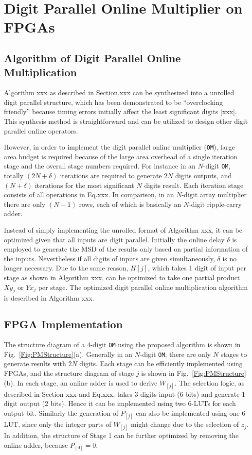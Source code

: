 \documentclass[conference]{IEEEtran}
\begin{document}
\section{Digit Parallel Online Multiplier on FPGAs}\label{Sec:OM_FPGA}
\subsection{Algorithm of Digit Parallel Online Multiplication}
Algorithm xxx as described in Section.xxx can be synthesized into a unrolled digit parallel structure, which has been demonstrated to be ``overclocking friendly'' because timing errors initially affect the least significant digits [xxx]. This synthesis method is straightforward and can be utilized to design other digit parallel online operators.

However, in order to implement the digit parallel online multiplier (\texttt{OM}), large area budget is required because of the large area overhead of a single iteration stage and the overall stage numbers required. For instance in an $N$-digit \texttt{OM}, totally $(2N+\delta)$ iterations are required to generate $2N$ digits outputs, and $(N+\delta)$ iterations for the most significant $N$ digits result. Each iteration stage consists of all operations in Eq.xxx. In comparison, in an $N$-digit array multiplier there are only $(N-1)$ rows, each of which is basically an $N$-digit ripple-carry adder.

Instead of simply implementing the unrolled format of Algorithm xxx, it can be optimized given that all inputs are digit parallel. Initially the online delay $\delta$ is employed to generate the MSD of the results only based on partial information of the inputs. Nevertheless if all digits of inputs are given simultaneously, $\delta$ is no longer necessary. Due to the same reason, $H[j]$, which takes 1 digit of input per stage as shown in Algorithm xxx, can be optimized to take one partial product $Xy_j$ or $Yx_j$ per stage. The optimized digit parallel online multiplication algorithm is described in Algorithm xxx.


\subsection{FPGA Implementation}
The structure diagram of a 4-digit \texttt{OM} using the proposed algorithm is shown in Fig.~\ref{Fig:PMStructure}(a). Generally in an $N$-digit \texttt{OM}, there are only $N$ stages to generate results with $2N$ digits. Each stage can be efficiently implemented using FPGAs, and the structure diagram of stage $j$ is shown in Fig.~\ref{Fig:PMStructure}(b). In each stage, an online adder is used to derive $W_{[j]}$. The selection logic, as described in Section xxx and Eq.xxx, takes 3 digits input (6 bits) and generate 1 digit output (2 bits). Hence it can be implemented using two 6-LUTs for each output bit. Similarly the generation of $P_{[j]}$ can also be implemented using one 6-LUT, since only the integer parts of $W_{[j]}$ might change due to the selection of $z_j$. In addition, the structure of Stage 1 can be further optimized by removing the online adder, because $P_{[0]}=0$.
\end{document}
